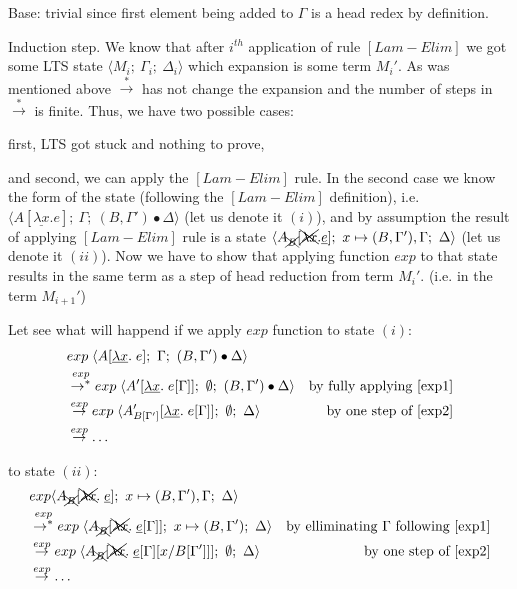 \documentclass[a4paper, 10pt]{article}
\begin{document}
Base: trivial since first element being added to $\Gamma$ is a head redex by definition.

Induction step. We know that after $i^{th}$ application of rule $[Lam-Elim]$ we got some LTS state $\langle M_i;\ \Gamma_i;\ \Delta_i \rangle$ which expansion is some term $M_i'$. As was mentioned above $\overset{*}{\rightarrow}$ has not change the expansion and the number of steps in $\overset{*}{\rightarrow}$ is finite. Thus, we have two possible cases:

first, LTS got stuck and nothing to prove,

and second, we can apply the $[Lam-Elim]$ rule. In the second case we know the form of the state (following the $[Lam-Elim]$ definition), i.e. $\langle A[\underline{\lambda x}. e];\ \Gamma;\ (B,\Gamma')\bullet\Delta \rangle$ (let us denote it $(i)$), and by assumption the result of applying $[Lam-Elim]$ rule is a state $\langle A_{\xcancel{B}}[\xcancel{\lambda x}.\underline{e}];\ x \mapsto (B,\Gamma'),\Gamma;\ \Delta \rangle$ (let us denote it $(ii)$). Now we have to show that applying function $exp$ to that state results in the same term as a step of head reduction from term $M_i'$. (i.e. in the term $M_{i+1}'$)

Let see what will happend if we apply $exp$ function to state $(i)$:
\begin{align}
  &exp\; \langle A[\underline{\lambda x}.\; e];\ \Gamma;\ (B,\Gamma')\bullet\Delta \rangle & \\
  &\overset{exp}{\rightarrow^{*}}
  exp\; \langle A'[\underline{\lambda x}.\; e[\Gamma]];\ \emptyset;\ (B,\Gamma')\bullet\Delta \rangle &\textnormal{by fully applying \eqref{exp1}} \\
  \label{i3} &\overset{exp}{\rightarrow}
  exp\; \langle A'_{B[\Gamma']}[\underline{\lambda x}.\; e[\Gamma]];\ \emptyset;\ \Delta \rangle &\textnormal{by one step of \eqref{exp2}} \\
  &\overset{exp}{\rightarrow}
  \dots &
\end{align}

to state $(ii)$:
\begin{align}
  &exp \langle A_{\xcancel{B}}[\xcancel{\lambda x}.\; \underline{e}];\ x \mapsto (B,\Gamma'),\Gamma;\ \Delta \rangle & \\
  &\overset{exp}{\rightarrow^{*}}
  exp\;\langle A_{\xcancel{B}}[\xcancel{\lambda x}.\; \underline{e}[\Gamma]];\ x \mapsto (B,\Gamma');\ \Delta \rangle &\textnormal{by elliminating $\Gamma$ following \eqref{exp1}} \\
  \label{ii3} &\overset{exp}{\rightarrow}
  exp\; \langle A_{\xcancel{B}}[\xcancel{\lambda x}.\; \underline{e}[\Gamma][x/B[\Gamma']]];\ \emptyset;\ \Delta \rangle &\textnormal{by one step of \eqref{exp2}} \\
  &\overset{exp}{\rightarrow}
  \dots &
\end{align}
\end{document}
